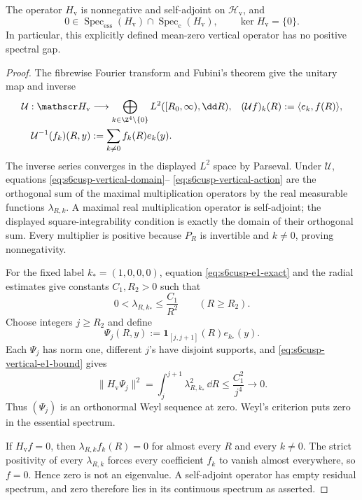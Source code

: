 \begin{theorem}
\label{thm:s6cusp-vertical-continuous-threshold}
The operator \(H_{\mathrm v}\) is nonnegative and self-adjoint on
\(\mathscr H_{\mathrm v}\), and
\begin{equation}\label{eq:s6cusp-vertical-threshold}
 0\in\operatorname{Spec}_{\mathrm{ess}}(H_{\mathrm v})
 \cap\operatorname{Spec}_{\mathrm c}(H_{\mathrm v}),
 \qquad
 \ker H_{\mathrm v}=\{0\}.
\end{equation}
In particular, this explicitly defined mean-zero vertical operator has no
positive spectral gap.
\end{theorem}

\begin{proof}
The fibrewise Fourier transform and Fubini's theorem give the unitary map
and inverse
\begin{align*}
 \mathcal U:\mathscr H_{\mathrm v}
 &\longrightarrow
 \bigoplus_{k\in\Z^4\setminus\{0\}}
 L^2([R_0,\infty),\dd R),
 & (\mathcal Uf)_k(R)&:=\langle e_k,f(R)\rangle,\\
 \mathcal U^{-1}(f_k)(R,y)
 &:=\sum_{k\ne0}f_k(R)e_k(y).
\end{align*}
The inverse series converges in the displayed \(L^2\) space by Parseval.
Under \(\mathcal U\), equations \eqref{eq:s6cusp-vertical-domain}--
\eqref{eq:s6cusp-vertical-action} are the orthogonal sum of the maximal
multiplication operators by the real measurable functions
\(\lambda_{R,k}\).  A maximal real multiplication operator is
self-adjoint; the displayed square-integrability condition is exactly the
domain of their orthogonal sum.  Every multiplier is positive because
\(P_R\) is invertible and \(k\ne0\), proving nonnegativity.

For the fixed label \(k_*=(1,0,0,0)\), equation
\eqref{eq:s6cusp-e1-exact} and the radial estimates give constants
\(C_1,R_2>0\) such that
\begin{equation}\label{eq:s6cusp-vertical-e1-bound}
 0<\lambda_{R,k_*}\le \frac{C_1}{R^2}
 \qquad(R\ge R_2).
\end{equation}
Choose integers \(j\ge R_2\) and define
\begin{equation}\label{eq:s6cusp-vertical-Weyl-sequence}
 \Psi_j(R,y):=\mathbf1_{[j,j+1]}(R)e_{k_*}(y).
\end{equation}
Each \(\Psi_j\) has norm one, different \(j\)'s have disjoint supports,
and \eqref{eq:s6cusp-vertical-e1-bound} gives
\[
 \lVert H_{\mathrm v}\Psi_j\rVert^2
 =\int_j^{j+1}\lambda_{R,k_*}^{2}\,\dd R
 \le \frac{C_1^2}{j^4}\longrightarrow0.
\]
Thus \((\Psi_j)\) is an orthonormal Weyl sequence at zero.  Weyl's
criterion puts zero in the essential spectrum.

If \(H_{\mathrm v}f=0\), then
\(\lambda_{R,k}f_k(R)=0\) for almost every \(R\) and every \(k\ne0\).
The strict positivity of every \(\lambda_{R,k}\) forces every coefficient
\(f_k\) to vanish almost everywhere, so \(f=0\).  Hence zero is not an
eigenvalue.  A self-adjoint operator has empty residual spectrum, and zero
therefore lies in its continuous spectrum as asserted.
\end{proof}

